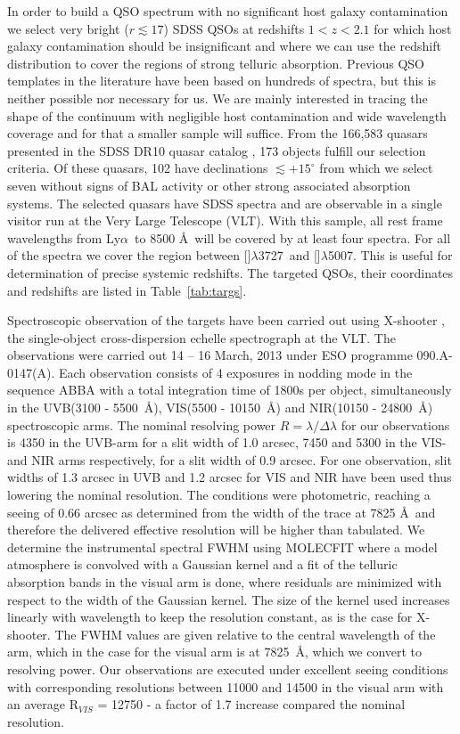\documentclass{aa}    %
\newcommand{\Tab}[1]{Table~\ref{tab:#1}}
\newcommand{\tab}[1]{\Tab{#1}}
\newcommand{\lya}{Ly$\alpha$}
\newcommand{\oii}{[\ion{O}{ii}]$\lambda$3727}
\newcommand{\oiii}{[\ion{O}{iii}]$\lambda$5007}
\begin{document}
In order to build a QSO spectrum with no significant host galaxy
contamination we select very bright ($r \lesssim 17$) SDSS QSOs at
redshifts $1 < z < 2.1$ for which host galaxy contamination should be
insignificant and where we can use the redshift distribution to cover
the regions of strong telluric absorption. Previous QSO templates in
the literature have been based on hundreds of spectra, but this is
neither possible nor necessary for us. We are mainly interested in
tracing the shape of the continuum with negligible host contamination
and wide wavelength coverage and for that a smaller sample will
suffice. From the 166,583 quasars presented in the SDSS DR10 quasar catalog \citep{Paris2014}, 173 objects fulfill our selection criteria. Of these quasars, 102 have declinations $\lesssim +15^\circ$ from which we select seven without signs of BAL activity or other strong associated absorption systems. The selected quasars have SDSS spectra and are observable in a single visitor run at the Very Large Telescope (VLT). With this sample, all rest frame
wavelengths from \lya~to 8500 \AA~will be covered by at least four
spectra. For all of the spectra we cover the region between \oii~and
\oiii. This is useful for determination of precise systemic
redshifts. The targeted QSOs, their coordinates and redshifts are
listed in \tab{targs}.

Spectroscopic observation of the targets have been carried out using X-shooter
\citep{Vernet2011}, the single-object cross-dispersion echelle spectrograph at
the VLT. The observations were carried out 14 -- 16 March, 2013 under ESO
programme 090.A-0147(A). Each observation consists of 4 exposures in nodding mode in
the sequence ABBA with a total integration time of 1800s per object,
simultaneously in the UVB(3100 - 5500~\AA), VIS(5500 - 10150~\AA)  and NIR(10150
- 24800~\AA) spectroscopic arms. The nominal resolving power $R = \lambda /
\Delta \lambda$ for our observations is 4350 in the UVB-arm for a slit width of
1.0 arcsec, 7450 and 5300 in the VIS- and NIR arms respectively, for a slit
width of 0.9 arcsec. For one observation, slit widths of 1.3 arcsec in UVB and
1.2 arcsec for VIS and NIR have been used thus lowering the nominal resolution.
The conditions were photometric, reaching a seeing of 0.66 arcsec as determined
from the width of the trace at 7825 \AA~and therefore the delivered effective
resolution will be higher than tabulated. We determine the instrumental spectral
FWHM using MOLECFIT \citep{Smette2015, Kausch2015} where a model atmosphere is
convolved with a Gaussian kernel and a fit of the telluric absorption bands in
the visual arm is done, where residuals are minimized with respect to the
width of the Gaussian kernel. The size of the kernel used increases linearly
with wavelength to keep the resolution constant, as is the case for X-shooter.
The FWHM values are given relative to the central wavelength of the arm, which
in the case for the visual arm is at 7825~\AA, which we convert to resolving
power.
Our observations are executed under excellent seeing conditions with
corresponding resolutions between 11000 and 14500 in the visual arm with an
average R$_{VIS}$ = 12750 - a factor of 1.7 increase compared the nominal
resolution. 
\end{document}
